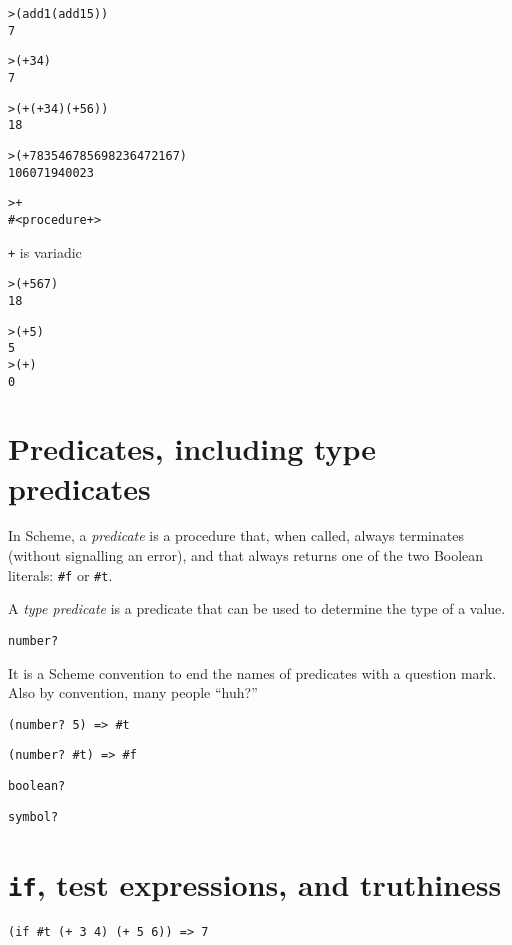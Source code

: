 \documentclass{book}
\begin{document}
\begin{alltt}
> (add1 (add1 5))
7 
\end{alltt}

\begin{alltt}
> (+ 3 4)
7
\end{alltt}

\begin{alltt}
> (+ (+ 3 4) (+ 5 6))
18
\end{alltt}

\begin{alltt}
> (+ 7835467856 98236472167)
106071940023
\end{alltt}

\begin{alltt}
> +
#<procedure +>
\end{alltt}

\verb|+| is variadic


\begin{alltt}
> (+ 5 6 7)
18
\end{alltt}

\begin{alltt}
> (+ 5)
5
> (+)
0
\end{alltt}

\section{Predicates, including type predicates}

In Scheme, a \emph{predicate} is a procedure that, when called, always terminates (without signalling an error), and that always returns one of the two Boolean literals: \verb|#f| or \verb|#t|.

A \emph{type predicate} is a predicate that can be used to determine the type of a value.

\verb|number?|

It is a Scheme convention to end the names of predicates with a question mark.
Also by convention, many people ``huh?'' 

\verb|(number? 5) => #t|

\verb|(number? #t) => #f|

\verb|boolean?|

\verb|symbol?|

\section{\texttt{if}, test expressions, and truthiness}

\verb|(if #t (+ 3 4) (+ 5 6)) => 7|
\end{document}
